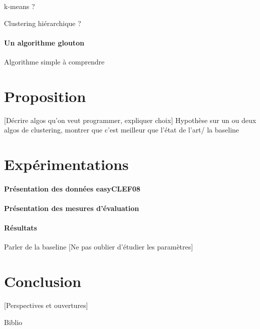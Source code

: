\documentclass{article}
\begin{document}
\begin{multicols}{2}
k-means ?

Clustering hiérarchique ?


\paragraph{Un algorithme glouton}
Algorithme simple à comprendre


\section{Proposition}
[Décrire algos qu'on veut programmer, expliquer choix]
Hypothèse sur un ou deux algos de clustering, montrer que c'est meilleur que l'état de l'art/ la baseline

\section{Expérimentations}
\paragraph{Présentation des données easyCLEF08}

\paragraph{Présentation des mesures d'évaluation}

\paragraph{Résultats}
Parler de la baseline
[Ne pas oublier d'étudier les paramètres]

\section{Conclusion}
[Perspectives et ouvertures]

Biblio

\end{multicols}
\end{document}
